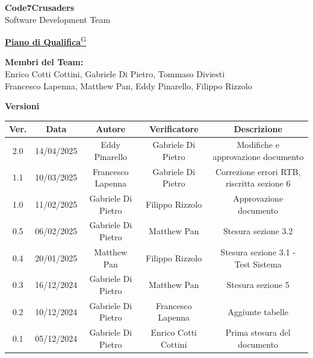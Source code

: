 \documentclass{article}
\begin{document}
\begin{titlepage}
    {\Huge \textbf{Code7Crusaders}}\\
    \vspace{0.5cm}
    {\Large Software Development Team}\\
    \vspace{2cm}
    
    {\large \href{https://code7crusaders.github.io/docs/PB/documentazione_interna/glossario.html#piano-di-progetto}{\textbf{Piano di Qualifica}\textsuperscript{G}}}\\
    \vspace{5cm}
    
    
    \textbf{Membri del Team:}\\
    Enrico Cotti Cottini, Gabriele Di Pietro, Tommaso Diviesti \\
    Francesco Lapenna, Matthew Pan, Eddy Pinarello, Filippo Rizzolo \\
    \vspace{0.5cm}
    
    \vspace{1cm}
\end{titlepage}



\begin{table}[h!]
\centering
\textbf{Versioni} \\ %
\vspace{2mm} %
\begin{tabular}{|c|c|c|c|c|}
    \hline
    \textbf{Ver.} & \textbf{Data} & \textbf{Autore} & \textbf{Verificatore} & \textbf{Descrizione} \\
    \hline
    2.0 & 14/04/2025 & Eddy Pinarello & Gabriele Di Pietro & Modifiche e approvazione documento \\
    1.1 & 10/03/2025 & Francesco Lapenna & Gabriele Di Pietro & Correzione errori RTB, riscritta sezione 6 \\
    1.0 & 11/02/2025 & Gabriele Di Pietro & Filippo Rizzolo & Approvazione documento \\
    0.5 & 06/02/2025 & Gabriele Di Pietro & Matthew Pan & Stesura sezione 3.2 \\
    0.4 & 20/01/2025 & Matthew Pan & Filippo Rizzolo & Stesura sezione 3.1 - Test Sistema \\
    0.3 & 16/12/2024 & Gabriele Di Pietro & Matthew Pan & Stesura sezione 5 \\
    0.2 & 10/12/2024 & Gabriele Di Pietro & Francesco Lapenna & Aggiunte tabelle \\
    0.1 & 05/12/2024 & Gabriele Di Pietro & Enrico Cotti Cottini & Prima stesura del documento \\  
    \hline
\end{tabular}
\label{tab:versioni}
\end{table}
\newpage
\end{document}
